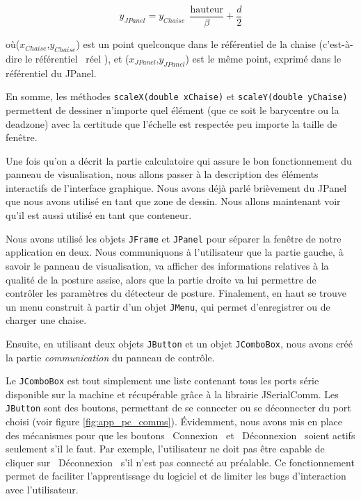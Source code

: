 \documentclass{polytech/polytech}
\begin{document}
\begin{equation}
\label{eqn:form_ref_vert}
y_{JPanel} = y_{Chaise}\ \ \frac{\mathrm{hauteur}}{\beta} + \frac{d}{2}
\end{equation}

où($x_{Chaise}$,$y_{Chaise}$) est un point quelconque dans le référentiel de la chaise (c'est-à-dire le référentiel \guillemotleft\ réel \guillemotright ), et ($x_{JPanel}$,$y_{JPanel}$) est le même point, exprimé dans le référentiel du JPanel.

En somme, les méthodes \texttt{scaleX(double xChaise)} et \texttt{scaleY(double yChaise)} permettent de dessiner n'importe quel élément (que ce soit le barycentre ou la deadzone) avec la certitude que l'échelle est respectée peu importe la taille de fenêtre.

Une fois qu'on a décrit la partie calculatoire qui assure le bon fonctionnement du panneau de visualisation, nous allons passer à la description des éléments interactifs de l'interface graphique. 
Nous avons déjà parlé brièvement du JPanel que nous avons utilisé en tant que zone de dessin. Nous allons maintenant voir qu'il est aussi utilisé en tant que conteneur.

Nous avons utilisé les objets \texttt{JFrame} et \texttt{JPanel} pour séparer la fenêtre de notre application en deux.
Nous communiquons à l'utilisateur que la partie gauche, à savoir le panneau de visualisation, va afficher des informations relatives à la qualité de la posture assise, alors que la partie droite va lui permettre de contrôler les paramètres du détecteur de posture.
 Finalement, en haut se trouve un menu construit à partir d'un objet \texttt{JMenu}, qui permet d'enregistrer ou de charger une chaise.

Ensuite, en utilisant deux objets \texttt{JButton} et un objet \texttt{JComboBox}, nous avons créé la partie \textit{communication} du panneau de contrôle.

 Le \texttt{JComboBox} est tout simplement une liste contenant tous les ports série disponible sur la machine et récupérable grâce à la librairie JSerialComm.
Les \texttt{JButton} sont des boutons, permettant de se connecter ou se déconnecter du port choisi (voir figure \ref{fig:app_pc_comms}). Évidemment, nous avons mis en place des mécanismes pour que les boutons \guillemotleft\ Connexion \guillemotright\ et \guillemotleft\ Déconnexion \guillemotright\ soient actifs seulement s'il le faut.
Par exemple, l'utilisateur ne doit pas être capable de cliquer sur \guillemotleft\ Déconnexion \guillemotright\ s'il n'est pas connecté au préalable. 
Ce fonctionnement permet de faciliter l'apprentissage du logiciel et de limiter les bugs d'interaction avec l'utilisateur.
\end{document}
